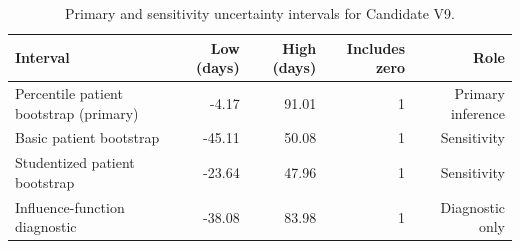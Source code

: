 \begin{table}[htbp]
\centering
\caption{Primary and sensitivity uncertainty intervals for Candidate V9.}
\label{tab:candidate_v9_intervals}
\small
\begin{tabular}{lrrrr}
\toprule
Interval & Low (days) & High (days) & Includes zero & Role \\
\midrule
Percentile patient bootstrap (primary) & -4.17 & 91.01 & 1 & Primary inference \\
Basic patient bootstrap & -45.11 & 50.08 & 1 & Sensitivity \\
Studentized patient bootstrap & -23.64 & 47.96 & 1 & Sensitivity \\
Influence-function diagnostic & -38.08 & 83.98 & 1 & Diagnostic only \\
\bottomrule
\end{tabular}
\par\vspace{2pt}{\footnotesize The percentile patient-bootstrap interval was prospectively designated as primary. Other intervals are sensitivity or diagnostic summaries.}
\end{table}

